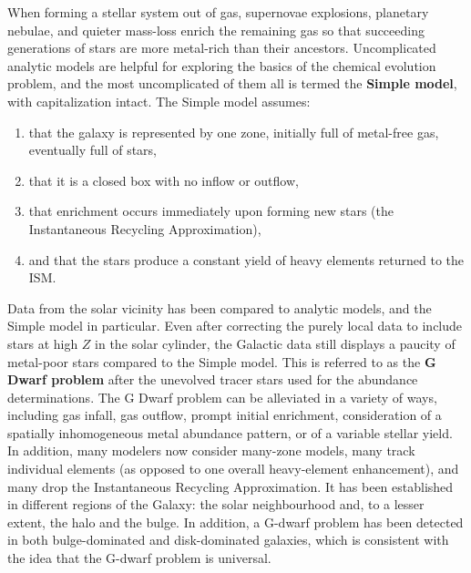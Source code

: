 \documentclass[a4paper,10pt]{article}
\begin{document}
When forming a stellar system out of gas, supernovae explosions, planetary nebulae, and quieter mass-loss enrich the remaining gas so that succeeding generations of stars are more metal-rich than their ancestors. Uncomplicated analytic models are helpful for exploring the basics of the chemical evolution problem, and the most uncomplicated of them all is termed the \textbf{Simple model}, with capitalization intact. The Simple model assumes:

\begin{enumerate}
    \item that the galaxy is represented by one zone, initially full of metal-free gas, eventually full of stars,
    \item that it is a closed box with no inflow or outflow,
    \item that enrichment occurs immediately upon forming new stars (the Instantaneous Recycling Approximation),
    \item and that the stars produce a constant yield of heavy elements returned to the ISM.
\end{enumerate}

{\noindent}Data from the solar vicinity has been compared to analytic models, and the Simple model in particular. Even after correcting the purely local data to include stars at high $Z$ in the solar cylinder, the Galactic data still displays a paucity of metal-poor stars compared to the Simple model. This is referred to as the \textbf{G Dwarf problem} after the unevolved tracer stars used for the abundance determinations. The G Dwarf problem can be alleviated in a variety of ways, including gas infall, gas outflow, prompt initial enrichment, consideration of a spatially inhomogeneous metal abundance pattern, or of a variable stellar yield. In addition, many modelers now consider many-zone models, many track individual elements (as opposed to one overall heavy-element enhancement), and many drop the Instantaneous Recycling Approximation. It has been established in different regions of the Galaxy: the solar neighbourhood and, to a lesser extent, the halo and the bulge. In addition, a G-dwarf problem has been detected in both bulge-dominated and disk-dominated galaxies, which is consistent with the idea that the G-dwarf problem is universal.
\end{document}
